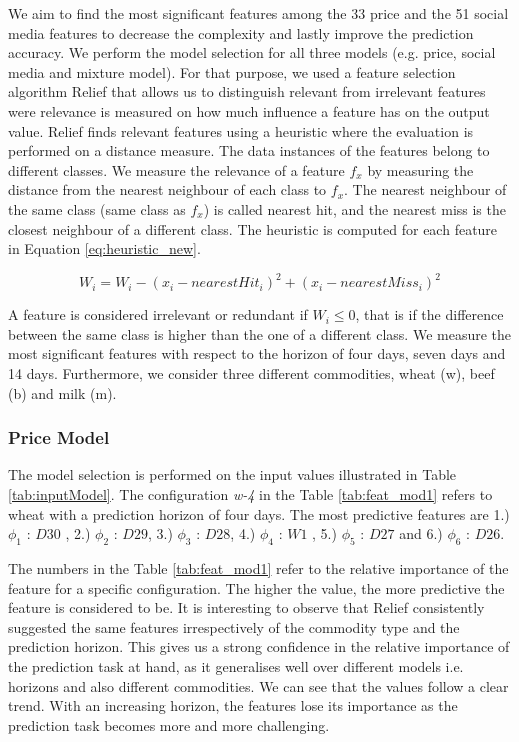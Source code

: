 We aim to find the most significant features among the 33 price and the 51 social media features to decrease the complexity and lastly improve the prediction accuracy. We perform the model selection for all three models (e.g. price, social media and mixture model). For that purpose, we used a feature selection algorithm Relief \cite{kira92} \cite{kono94} \cite{Robnik97} that allows us to distinguish relevant from irrelevant features were relevance is measured on how much influence a feature has on the output value. Relief finds relevant features using a heuristic where the evaluation is performed on a distance measure. The data instances of the features belong to different classes. We measure the relevance of a feature $f_x$ by measuring the distance from the nearest neighbour of each class to $f_x$. The nearest neighbour of the same class (same class as $f_x$) is called nearest hit, and the nearest miss is the closest neighbour of a different class.  The heuristic is computed for each feature in Equation \ref{eq:heuristic_new}.

\begin{equation} \label{eq:heuristic_new}
W_i = W_i  - (x_i - nearestHit_i)^2 + (x_i - nearestMiss_i)^2
\end{equation}

A feature is considered irrelevant or redundant if $W_i \leq 0$, that is if the difference between the same class is higher than the one of a different class.  We measure the most significant features with respect to the horizon of four days, seven days and 14 days. Furthermore, we consider three different commodities, wheat (w), beef (b) and milk (m).


\subsubsection{Price Model}

The model selection is performed on the input values illustrated in Table \ref{tab:inputModel}. The configuration \emph{w-4} in the Table \ref{tab:feat_mod1} refers to wheat with a prediction horizon of four days. The most predictive features are  1.) $\phi_1$ : $D30$ , 2.) $\phi_2$ : $D29$,  3.) $\phi_3$ : $D28$, 4.) $\phi_4$ : $W1$ , 5.) $\phi_5$ : $D27$ and 6.) $\phi_6$ : $D26$.

The numbers in the Table \ref{tab:feat_mod1} refer to the relative importance of the feature for a specific configuration. The higher the value, the more predictive the feature is considered to be. It is interesting to observe that Relief consistently suggested the same features irrespectively of the commodity type and the prediction horizon. This gives us a strong confidence in the relative importance of the prediction task at hand, as it generalises well over different models i.e. horizons and also different commodities. We can see that the values follow a clear trend. With an increasing horizon, the features lose its importance as the prediction task becomes more and more challenging. 

